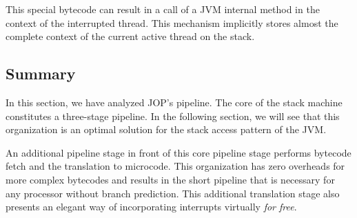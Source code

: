 This special bytecode can result in a call of a JVM internal method
in the context of the interrupted thread. This mechanism implicitly
stores almost the complete context of the current active thread on
the stack.

\subsection{Summary}

In this section, we have analyzed JOP's pipeline. The core of the
stack machine constitutes a three-stage pipeline. In the following
section, we will see that this organization is an optimal solution
for the stack access pattern of the JVM.

An additional pipeline stage in front of this core pipeline stage
performs bytecode fetch and the translation to microcode. This
organization has zero overheads for more complex bytecodes and
results in the short pipeline that is necessary for any processor
without branch prediction. This additional translation stage also
presents an elegant way of incorporating interrupts virtually
\emph{for free}.

